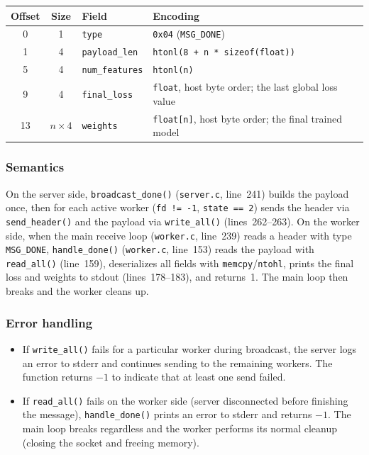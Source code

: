 \documentclass[11pt]{article}
\begin{document}
\begin{table}[H]
\centering
\begin{tabular}{@{}c c l l@{}}
\toprule
\textbf{Offset} & \textbf{Size} & \textbf{Field} & \textbf{Encoding} \\
\midrule
0  & 1             & \texttt{type}         & \texttt{0x04} (\texttt{MSG\_DONE}) \\
1  & 4             & \texttt{payload\_len} & \texttt{htonl(8 + n * sizeof(float))} \\
5  & 4             & \texttt{num\_features} & \texttt{htonl(n)} \\
9  & 4             & \texttt{final\_loss}  & \texttt{float}, host byte order; the last global loss value \\
13 & $n \times 4$  & \texttt{weights}      & \texttt{float[n]}, host byte order; the final trained model \\
\bottomrule
\end{tabular}
\end{table}

\subsubsection*{Semantics}
On the server side, \texttt{broadcast\_done()} (\texttt{server.c}, line~241)
builds the payload once, then for each active worker
(\texttt{fd != -1}, \texttt{state == 2}) sends the header via
\texttt{send\_header()} and the payload via \texttt{write\_all()}
(lines~262--263). On the worker side, when the main receive loop
(\texttt{worker.c}, line~239) reads a header with type \texttt{MSG\_DONE},
\texttt{handle\_done()} (\texttt{worker.c}, line~153) reads the payload with
\texttt{read\_all()} (line~159), deserializes all fields with
\texttt{memcpy}/\texttt{ntohl}, prints the final loss and weights to stdout
(lines~178--183), and returns~1. The main loop then breaks and the worker
cleans up.

\subsubsection*{Error handling}

\begin{itemize}
  \item If \texttt{write\_all()} fails for a particular worker during broadcast,
    the server logs an error to stderr and continues sending to the remaining
    workers. The function returns $-1$ to indicate that at least one send
    failed.
  \item If \texttt{read\_all()} fails on the worker side (server disconnected
    before finishing the message), \texttt{handle\_done()} prints an error to
    stderr and returns $-1$. The main loop breaks regardless and the worker
    performs its normal cleanup (closing the socket and freeing memory).
\end{itemize}
\end{document}
